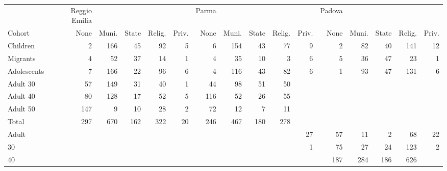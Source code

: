 {
\def\sym#1{\ifmmode^{#1}\else\(^{#1}\)\fi}
\begin{tabular}{l*{15}{r}}
\toprule
            &Reggio Emilia&            &            &            &            &       Parma&            &            &            &            &      Padova&            &            &            &            \\
Cohort      &        None&       Muni.&       State&      Relig.&       Priv.&        None&       Muni.&       State&      Relig.&       Priv.&        None&       Muni.&       State&      Relig.&       Priv.\\
\midrule
Children    &           2&         166&          45&          92&           5&           6&         154&          43&          77&           9&           2&          82&          40&         141&          12\\
Migrants    &           4&          52&          37&          14&           1&           4&          35&          10&           3&           6&           5&          36&          47&          23&           1\\
Adolescents &           7&         166&          22&          96&           6&           4&         116&          43&          82&           6&           1&          93&          47&         131&           6\\
Adult 30    &          57&         149&          31&          40&           1&          44&          98&          51&          50&            &            &            &            &            &            \\
Adult 40    &          80&         128&          17&          52&           5&         116&          52&          26&          55&            &            &            &            &            &            \\
Adult 50    &         147&           9&          10&          28&           2&          72&          12&           7&          11&            &            &            &            &            &            \\
Total       &         297&         670&         162&         322&          20&         246&         467&         180&         278&            &            &            &            &            &            \\
Adult       &            &            &            &            &            &            &            &            &            &          27&          57&          11&           2&          68&          22\\
30          &            &            &            &            &            &            &            &            &            &           1&          75&          27&          24&         123&           2\\
40          &            &            &            &            &            &            &            &            &            &            &         187&         284&         186&         626&            \\
\bottomrule
\end{tabular}
}
